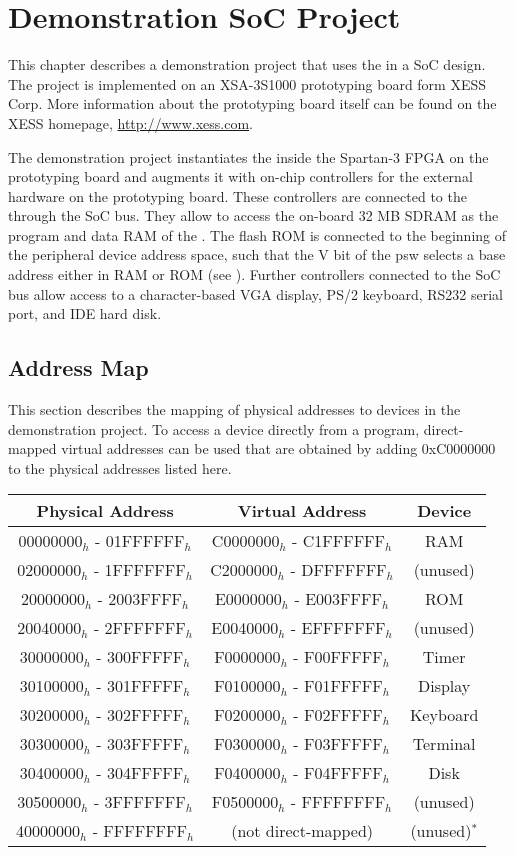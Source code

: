 \chapter{Demonstration SoC Project}

This chapter describes a demonstration project that uses the \eco in a SoC design. The project is implemented on an XSA-3S1000 prototyping board form XESS Corp. More information about the prototyping board itself can be found on the XESS homepage, \href{http://www.xess.com}{http://www.xess.com}.

The demonstration project instantiates the \eco inside the Spartan-3 FPGA on the prototyping board and augments it with on-chip controllers for the external hardware on the prototyping board. These controllers are connected to the \eco through the SoC bus. They allow to access the on-board 32 MB SDRAM as the program and data RAM of the \ecox. The flash ROM is connected to the beginning of the peripheral device address space, such that the V bit of the psw selects a base address either in RAM or ROM (see ). Further controllers connected to the SoC bus allow access to a character-based VGA display, PS/2 keyboard, RS232 serial port, and IDE hard disk.

\section{Address Map}

This section describes the mapping of physical addresses to devices in the demonstration project. To access a device directly from a program, direct-mapped virtual addresses can be used that are obtained by adding 0xC0000000 to the physical addresses listed here.

\begin{tabular}{|c|c|c|}
\hline
Physical Address & Virtual Address & Device\\
\hline
00000000$_h$ - 01FFFFFF$_h$ & C0000000$_h$ - C1FFFFFF$_h$ & RAM\\
02000000$_h$ - 1FFFFFFF$_h$ & C2000000$_h$ - DFFFFFFF$_h$ & (unused)\\
20000000$_h$ - 2003FFFF$_h$ & E0000000$_h$ - E003FFFF$_h$ & ROM\\
20040000$_h$ - 2FFFFFFF$_h$ & E0040000$_h$ - EFFFFFFF$_h$ & (unused)\\
30000000$_h$ - 300FFFFF$_h$ & F0000000$_h$ - F00FFFFF$_h$ & Timer\\
30100000$_h$ - 301FFFFF$_h$ & F0100000$_h$ - F01FFFFF$_h$ & Display\\
30200000$_h$ - 302FFFFF$_h$ & F0200000$_h$ - F02FFFFF$_h$ & Keyboard\\
30300000$_h$ - 303FFFFF$_h$ & F0300000$_h$ - F03FFFFF$_h$ & Terminal\\
30400000$_h$ - 304FFFFF$_h$ & F0400000$_h$ - F04FFFFF$_h$ & Disk\\
30500000$_h$ - 3FFFFFFF$_h$ & F0500000$_h$ - FFFFFFFF$_h$ & (unused)\\
40000000$_h$ - FFFFFFFF$_h$ & (not direct-mapped) & (unused)$^*$\\
\hline
\end{tabular}

